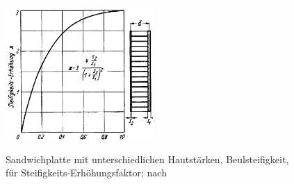 \begin{figure}[h]
	\centering
	\includegraphics[width=0.5\textwidth]{Bilder/Hertel Sandwich.png}
	\label{fig: Hertel_Sandwich}
	\caption{Sandwichplatte mit unterschiedlichen Hautstärken, Beulsteifigkeit, für Steifigkeits-Erhöhungsfaktor; nach \cite{item1}}
\end{figure}
\newpage

 \label{Profilkontur}

